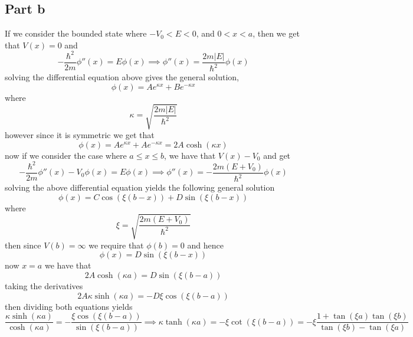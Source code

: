 \documentclass[12pt]{report}
\begin{document}
\subsection*{Part b}
If we consider the bounded state where $-V_0 < E < 0$, and $0 < x < a$, then we get that $V(x) = 0$ and
\begin{equation*}
    -\frac{\hbar^2}{2m} \phi''(x) = E \phi(x) \implies \phi''(x) = \frac{2m |E|}{\hbar^2} \phi(x)
\end{equation*}
solving the differential equation above gives the general solution,
\begin{equation*}
    \phi(x) = Ae^{\kappa x} + Be^{-\kappa x}
\end{equation*}
where
\begin{equation*}
    \kappa = \sqrt{\frac{2m |E|}{\hbar^2}}
\end{equation*}
however since it is symmetric we get that
\begin{equation*}
     \phi(x) = Ae^{\kappa x} + Ae^{-\kappa x} = 2A\cosh(\kappa x)
\end{equation*}
now if we consider the case where $a \leq x \leq b$, we have that $V(x) - V_0$ and get
\begin{equation*}
    -\frac{\hbar^2}{2m}\phi''(x) - V_0 \phi(x) = E\phi(x) \implies \phi''(x) = -\frac{2m(E + V_0)}{\hbar^2} \phi(x)
\end{equation*}
solving the above differential equation yields the following general solution
\begin{equation*}
    \phi(x) = C \cos(\xi (b-x)) + D \sin(\xi(b-x))
\end{equation*}
where 
\begin{equation*}
    \xi = \sqrt{\frac{2m(E + V_0)}{\hbar^2}}
\end{equation*}
then since $V(b) = \infty$ we require that $\phi(b) = 0$ and hence 
\begin{equation*}
    \phi(x) = D \sin(\xi (b-x))
\end{equation*}
now $x = a$ we have that
\begin{equation*}
    2A \cosh(\kappa a) = D \sin(\xi(b-a))
\end{equation*}
taking the derivatives 
\begin{equation*}
    2A\kappa \sinh(\kappa a) =  -D\xi\cos(\xi(b-a))
\end{equation*}
then dividing both equations yields
\begin{equation*}
    \frac{\kappa \sinh(\kappa a)}{\cosh(\kappa a)} = -\frac{\xi \cos(\xi(b-a))}{\sin(\xi(b-a))} \implies \kappa \tanh(\kappa a) = -\xi \cot(\xi (b-a)) = -\xi \frac{1 + \tan(\xi a)\tan(\xi b)}{\tan(\xi b) - \tan(\xi a)}
\end{equation*}
\end{document}
